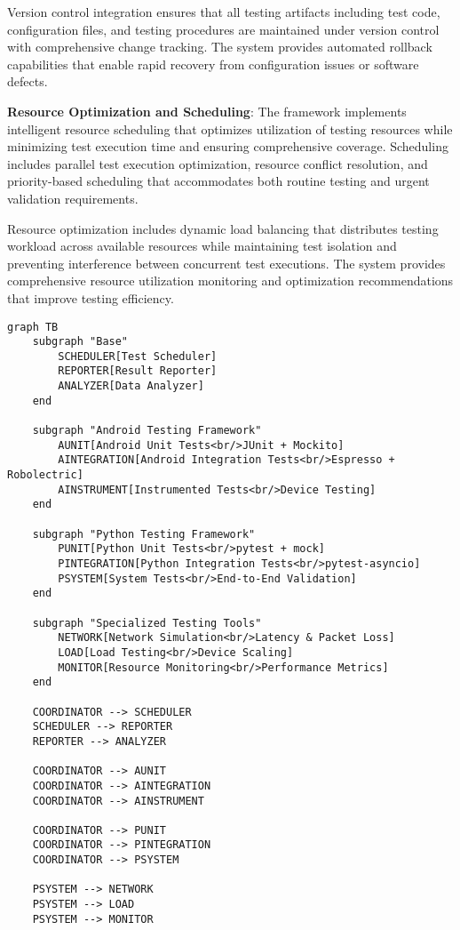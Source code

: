 \documentclass[12pt,a4paper]{article}
\begin{document}
Version control integration ensures that all testing artifacts including test code, configuration files, and testing
procedures are maintained under version control with comprehensive change tracking. The system provides automated
rollback capabilities that enable rapid recovery from configuration issues or software defects.

\textbf{Resource Optimization and Scheduling}: The framework implements intelligent resource scheduling that optimizes
utilization of testing resources while minimizing test execution time and ensuring comprehensive coverage. Scheduling
includes parallel test execution optimization, resource conflict resolution, and priority-based scheduling that
accommodates both routine testing and urgent validation requirements.

Resource optimization includes dynamic load balancing that distributes testing workload across available resources while
maintaining test isolation and preventing interference between concurrent test executions. The system provides
comprehensive resource utilization monitoring and optimization recommendations that improve testing efficiency.

\begin{verbatim}
graph TB
    subgraph "Base"
        SCHEDULER[Test Scheduler]
        REPORTER[Result Reporter]
        ANALYZER[Data Analyzer]
    end
    
    subgraph "Android Testing Framework"
        AUNIT[Android Unit Tests<br/>JUnit + Mockito]
        AINTEGRATION[Android Integration Tests<br/>Espresso + Robolectric]
        AINSTRUMENT[Instrumented Tests<br/>Device Testing]
    end
    
    subgraph "Python Testing Framework"
        PUNIT[Python Unit Tests<br/>pytest + mock]
        PINTEGRATION[Python Integration Tests<br/>pytest-asyncio]
        PSYSTEM[System Tests<br/>End-to-End Validation]
    end
    
    subgraph "Specialized Testing Tools"
        NETWORK[Network Simulation<br/>Latency & Packet Loss]
        LOAD[Load Testing<br/>Device Scaling]
        MONITOR[Resource Monitoring<br/>Performance Metrics]
    end
    
    COORDINATOR --> SCHEDULER
    SCHEDULER --> REPORTER
    REPORTER --> ANALYZER
    
    COORDINATOR --> AUNIT
    COORDINATOR --> AINTEGRATION
    COORDINATOR --> AINSTRUMENT
    
    COORDINATOR --> PUNIT
    COORDINATOR --> PINTEGRATION
    COORDINATOR --> PSYSTEM
    
    PSYSTEM --> NETWORK
    PSYSTEM --> LOAD
    PSYSTEM --> MONITOR
\end{verbatim}
\end{document}
